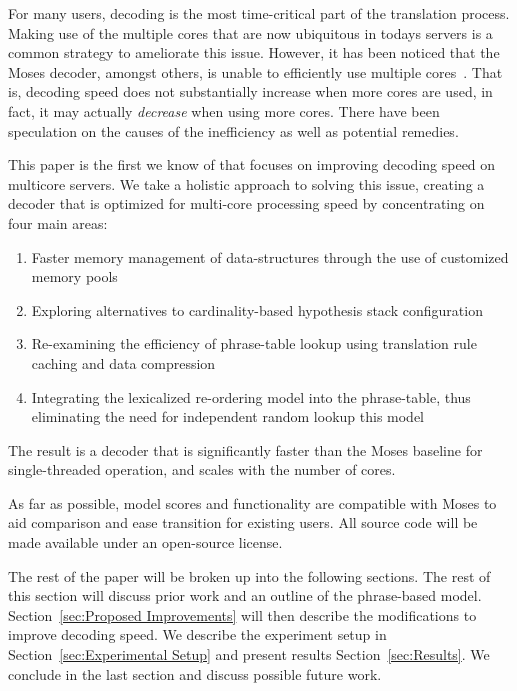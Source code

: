 \documentclass[]{article}
\begin{document}
For many users, decoding is the most time-critical part of the translation process. Making use of the multiple cores that are now ubiquitous in todays servers is a common strategy to ameliorate this issue. However, it has been noticed that the Moses decoder, amongst others, is unable to efficiently use multiple cores~\citep{mfernandez2016boosting}. That is, decoding speed does not substantially increase when more cores are used, in fact, it may actually \emph{decrease} when using more cores. There have been speculation on the causes of the inefficiency as well as potential remedies. 

This paper is the first we know of that focuses on improving decoding speed on multicore servers. We take a holistic approach to solving this issue, creating a decoder that is optimized for multi-core processing speed by concentrating on four main areas:
\begin{enumerate}
  \item \vspace{-2 mm} Faster memory management of data-structures through the use of customized memory pools
  \item \vspace{-2 mm} Exploring alternatives to cardinality-based hypothesis stack configuration
  \item \vspace{-2 mm} Re-examining the efficiency of phrase-table lookup using translation rule caching and data compression
  \item \vspace{-2 mm} Integrating the lexicalized re-ordering model into the phrase-table, thus eliminating the need for independent random lookup this model 
\end{enumerate}
The result is a decoder that is significantly faster than the Moses baseline for single-threaded operation, and scales with the number of cores.

As far as possible, model scores and functionality are compatible with Moses to aid comparison and ease transition for existing users. All source code will be made available under an open-source license.

The rest of the paper will be broken up into the following sections. The rest of this section will discuss prior work and an outline of the phrase-based model. Section~\ref{sec:Proposed Improvements} will then describe the modifications to improve decoding speed. We describe the experiment setup in Section~\ref{sec:Experimental Setup} and present results Section~\ref{sec:Results}. We conclude in the last section and discuss possible future work.
\end{document}
